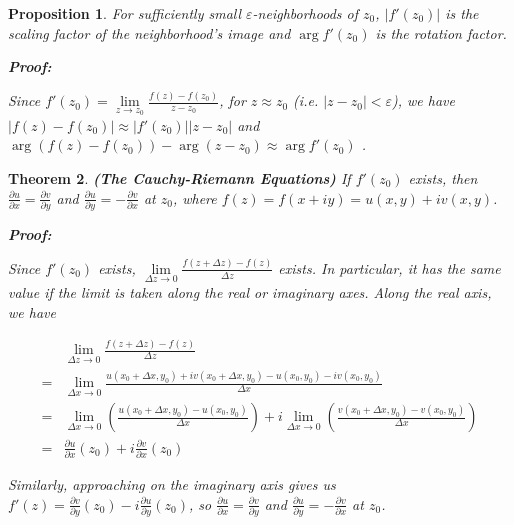 \documentclass{article}
\theoremstyle{colontheorem}
\newtheorem{theorem}{Theorem}[section]
\newtheorem{proposition}[theorem]{Proposition}
\newenvironment{Theorem}
{
	\begin{mdframed}[backgroundcolor=TheoremOrange!10]
	\begin{theorem}
}
{
	\end{theorem}
	\end{mdframed}
	
	\vspace{.15in}
}
\newenvironment{Proposition}
{
	\begin{mdframed}[backgroundcolor=TheoremOrange!10]
	\begin{proposition}
}
{
	\end{proposition}
	\end{mdframed}
	
	\vspace{.15in}
}
\newenvironment{Proof}
{
	\begin{mdframed}[backgroundcolor=ProofPurple!10]
	\textbf{Proof:}%
}
{
	\end{mdframed}
	
	\vspace{.085in}
}
\begin{document}
\begin{Proposition}
	
	For sufficiently small $\varepsilon$-neighborhoods of $z_0$, $|f'(z_0)|$ is the scaling factor of the neighborhood's image and $\arg f'(z_0)$ is the rotation factor.
	
	\begin{Proof}
		
		Since $f'(z_0) = \lim\limits_{z \to z_0} \frac{f(z) - f(z_0)}{z - z_0}$, for $z \approx z_0$ (i.e. $|z - z_0| < \varepsilon$), we have $|f(z) - f(z_0)| \approx |f'(z_0)||z - z_0|$ and $\arg (f(z) - f(z_0)) - \arg(z - z_0) \approx \arg f'(z_0)$
		.
	\end{Proof}
	
\end{Proposition}



\begin{Theorem}
	
	\textbf{(The Cauchy-Riemann Equations)} If $f'(z_0)$ exists, then $\frac{\partial u}{\partial x} = \frac{\partial v}{\partial y}$ and $\frac{\partial u}{\partial y} = -\frac{\partial v}{\partial x}$ at $z_0$, where $f(z) = f(x + iy) = u(x, y) + iv(x, y)$.
	
	\begin{Proof}
		Since $f'(z_0)$ exists, $\lim\limits_{\Delta z \to 0} \frac{f(z + \Delta z) - f(z)}{\Delta z}$ exists. In particular, it has the same value if the limit is taken along the real or imaginary axes. Along the real axis, we have
		
		\begin{align*}
			& \lim\limits_{\Delta z \to 0} \frac{f(z + \Delta z) - f(z)}{\Delta z}\\
			= & \lim\limits_{\Delta x \to 0} \frac{u(x_0 + \Delta x, y_0) + iv(x_0 + \Delta x, y_0) - u(x_0, y_0) - iv(x_0, y_0)}{\Delta x}\\
			= & \lim\limits_{\Delta x \to 0} \left( \frac{u(x_0 + \Delta x, y_0) - u(x_0, y_0)}{\Delta x} \right) + i \lim\limits_{\Delta x \to 0} \left( \frac{v(x_0 + \Delta x, y_0) - v(x_0, y_0)}{\Delta x} \right)\\
			= & \frac{\partial u}{\partial x}(z_0) + i \frac{\partial v}{\partial x}(z_0)
		\end{align*}
		
		Similarly, approaching on the imaginary axis gives us $f'(z) = \frac{\partial v}{\partial y}(z_0) - i \frac{\partial u}{\partial y}(z_0)$, so $\frac{\partial u}{\partial x} = \frac{\partial v}{\partial y}$ and $\frac{\partial u}{\partial y} = -\frac{\partial v}{\partial x}$ at $z_0$.
		
	\end{Proof}
	
\end{Theorem}
\end{document}
